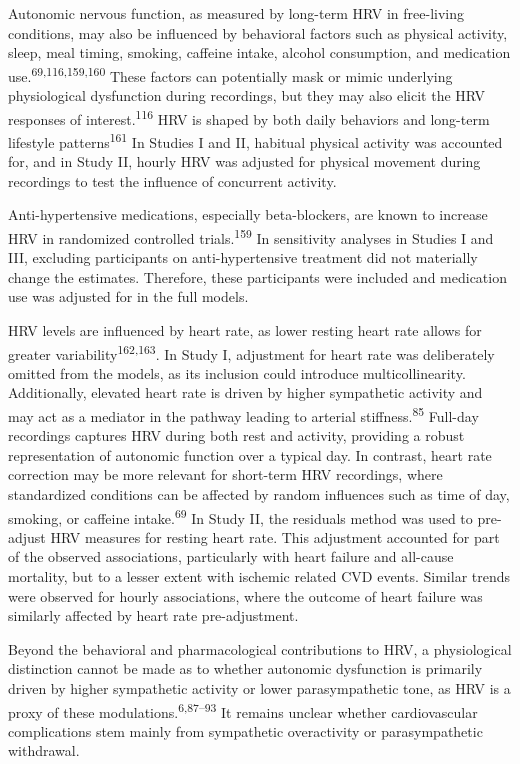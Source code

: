 \documentclass[
  a4paper,
  headsepline=true,
  open=left]{scrbook}
\begin{document}
Autonomic nervous function, as measured by long-term HRV in free-living
conditions, may also be influenced by behavioral factors such as
physical activity, sleep, meal timing, smoking, caffeine intake, alcohol
consumption, and medication use.\textsuperscript{69,116,159,160} These
factors can potentially mask or mimic underlying physiological
dysfunction during recordings, but they may also elicit the HRV
responses of interest.\textsuperscript{116} HRV is shaped by both daily
behaviors and long-term lifestyle patterns\textsuperscript{161} In
Studies I and II, habitual physical activity was accounted for, and in
Study II, hourly HRV was adjusted for physical movement during
recordings to test the influence of concurrent activity.

Anti-hypertensive medications, especially beta-blockers, are known to
increase HRV in randomized controlled trials.\textsuperscript{159} In
sensitivity analyses in Studies I and III, excluding participants on
anti-hypertensive treatment did not materially change the estimates.
Therefore, these participants were included and medication use was
adjusted for in the full models.

HRV levels are influenced by heart rate, as lower resting heart rate
allows for greater variability\textsuperscript{162,163}. In Study I,
adjustment for heart rate was deliberately omitted from the models, as
its inclusion could introduce multicollinearity. Additionally, elevated
heart rate is driven by higher sympathetic activity and may act as a
mediator in the pathway leading to arterial
stiffness.\textsuperscript{85} Full-day recordings captures HRV during
both rest and activity, providing a robust representation of autonomic
function over a typical day. In contrast, heart rate correction may be
more relevant for short-term HRV recordings, where standardized
conditions can be affected by random influences such as time of day,
smoking, or caffeine intake.\textsuperscript{69} In Study II, the
residuals method was used to pre-adjust HRV measures for resting heart
rate. This adjustment accounted for part of the observed associations,
particularly with heart failure and all-cause mortality, but to a lesser
extent with ischemic related CVD events. Similar trends were observed
for hourly associations, where the outcome of heart failure was
similarly affected by heart rate pre-adjustment.

Beyond the behavioral and pharmacological contributions to HRV, a
physiological distinction cannot be made as to whether autonomic
dysfunction is primarily driven by higher sympathetic activity or lower
parasympathetic tone, as HRV is a proxy of these
modulations.\textsuperscript{6,87--93} It remains unclear whether
cardiovascular complications stem mainly from sympathetic overactivity
or parasympathetic withdrawal.
\end{document}
